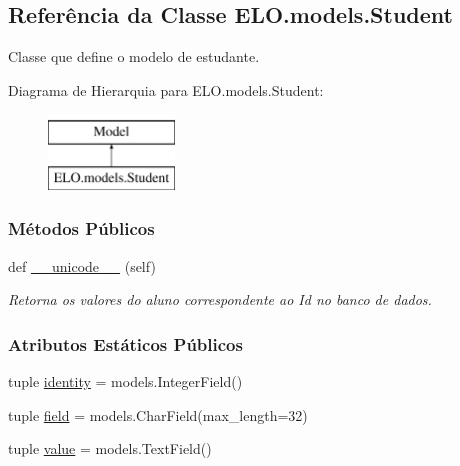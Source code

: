 \hypertarget{classELO_1_1models_1_1Student}{}\subsection{Referência da Classe E\+L\+O.\+models.\+Student}
\label{classELO_1_1models_1_1Student}


Classe que define o modelo de estudante.  


Diagrama de Hierarquia para E\+L\+O.\+models.\+Student\+:\begin{figure}[H]
\begin{center}
\leavevmode
\includegraphics[height=2.000000cm]{d0/dc8/classELO_1_1models_1_1Student}
\end{center}
\end{figure}
\subsubsection*{Métodos Públicos}
\begin{DoxyCompactItemize}
\item 
def \hyperlink{classELO_1_1models_1_1Student_aed993e386d125c955def72680b441dd1}{\+\_\+\+\_\+unicode\+\_\+\+\_\+} (self)
\begin{DoxyCompactList}\small\item\em Retorna os valores do aluno correspondente ao Id no banco de dados. \end{DoxyCompactList}\end{DoxyCompactItemize}
\subsubsection*{Atributos Estáticos Públicos}
\begin{DoxyCompactItemize}
\item 
tuple \hyperlink{classELO_1_1models_1_1Student_a20a7789a2b0f5b7d0c98453dcf38bc4e}{identity} = models.\+Integer\+Field()
\item 
tuple \hyperlink{classELO_1_1models_1_1Student_a893ec9b2ece5c6b829fce5e5a7c1d576}{field} = models.\+Char\+Field(max\+\_\+length=32)
\item 
tuple \hyperlink{classELO_1_1models_1_1Student_a201226779dce6e064cb16bd92ed016e2}{value} = models.\+Text\+Field()
\end{DoxyCompactItemize}


